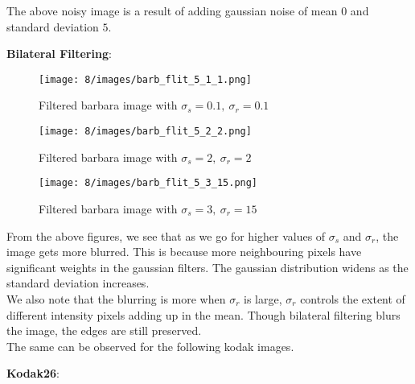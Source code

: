\documentclass[12pt]{article}
\begin{document}
\begin{itemize}
    The above noisy image is a result of adding gaussian noise of mean $0$ and standard deviation $5$.
    \newpage
    
    \textbf{Bilateral Filtering}:
    
    \begin{figure}[H]
        \centering
        \begin{minipage}{.45\textwidth}
          \centering
          \texttt{[image: 8/images/barb\_flit\_5\_1\_1.png]}
          \caption*{Filtered barbara image with $\sigma_s=0.1, \ \sigma_r=0.1$}
          \label{fig:totalpowervst}
        \end{minipage}
        \begin{minipage}{.45\textwidth}
          \centering
          \texttt{[image: 8/images/barb\_flit\_5\_2\_2.png]}
          \caption*{Filtered barbara image with $\sigma_s=2, \ \sigma_r=2$}
          \label{fig:totalpower2}
        \end{minipage}
        \label{fig:totalPower}
    \end{figure}
    
    \begin{figure}[H]
        \centering
        \begin{minipage}{.45\textwidth}
          \centering
          \texttt{[image: 8/images/barb\_flit\_5\_3\_15.png]}
          \caption*{Filtered barbara image with $\sigma_s=3, \ \sigma_r=15$}
          \label{fig:totalpowervst}
        \end{minipage}
    \end{figure}
    From the above figures, we see that as we go for higher values of $\sigma_s$ and $\sigma_r$, the image gets more blurred. This is because more neighbouring pixels have significant weights in the gaussian filters. The gaussian distribution widens as the standard deviation increases.\\
    We also note that the blurring is more when $\sigma_r$ is large, $\sigma_r$ controls the extent of different intensity pixels adding up in the mean. Though bilateral filtering blurs the image, the edges are still preserved.\\[5pt]
    The same can be observed for the following kodak images.
    \newpage
    
    \textbf{Kodak26}:
    

\end{itemize}
\end{document}
